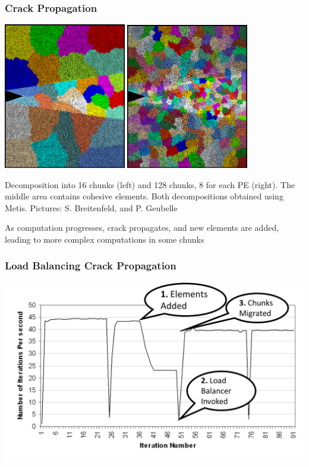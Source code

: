 \begin{frame}[fragile]
\frametitle{Crack Propagation}
\begin{centering}
\includegraphics[width=0.4\textwidth]{figures/chunkGraph16}
\includegraphics[width=0.4\textwidth]{figures/chunkGraph128}
\end{centering}
Decomposition into 16 chunks (left) and 128 chunks, 8 for each PE (right). The middle area contains cohesive elements. Both decompositions obtained using Metis. Pictures: S. Breitenfeld, and P. Geubelle

As computation progresses, crack propagates, and new elements are added, leading to more complex computations in some chunks
\end{frame}

\begin{frame}[fragile]
\frametitle{Load Balancing Crack Propagation}
\begin{centering}
\includegraphics[width=1.0\textwidth]{figures/LButilizationCrackPropWithAnnotation}
\end{centering}
\end{frame}


